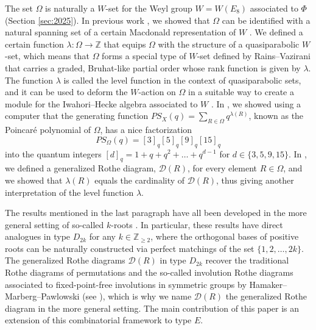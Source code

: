 \documentclass[11pt]{amsart}
\theoremstyle{plain}
\theoremstyle{definition}
\theoremstyle{remark}
\numberwithin{equation}{section}
\newcommand{\Z}{{\mathbb Z}}
\newcommand{\ra}{\rightarrow}
\newcommand{\res}{\mathscr{D}}
\newcommand{\ob}{\Omega}
\begin{document}
The set $\ob$ is naturally a $W$-set for the Weyl group $W=W(E_8)$ associated to
$\Phi$ (Section \ref{sec:2025}). In previous work \cite{gx5}, we showed that
$\ob$ can be identified with a natural spanning set of a certain Macdonald
representation of $W$ \cite[Section 1]{gx5}. We defined a certain function
$\lambda: \ob\ra \Z$ that equips $\ob$ with the structure of a quasiparabolic
$W$-set, which means that $\ob$ forms a special type of $W$-set defined by
Rains--Vazirani \cite{rains13} that carries a graded, Bruhat-like partial order
whose rank function is given by $\lambda$. The function $\lambda$ is called the
level function in the context of quasiparabolic sets, and it can be used to
deform the $W$-action on $\ob$ in a suitable way to create a module for the
Iwahori--Hecke algebra associated to $W$ \cite[Theorem 7.1]{rains13}. In
\cite[Section 7.1]{gx5}, we showed using a computer that the generating function
$PS_X(q)=\sum_{R\in \ob} q^{\lambda(R)}$, known as the Poincar\'e polynomial of
$\ob$, has a nice factorization \begin{equation} \label{eq:ps_X}
PS_\ob(q)=[3]_q[5]_q[9]_q[15]_q \end{equation} into the quantum integers
$[d]_q=1+q+q^2+\dots+q^{d-1}$ for $d\in \{3,5,9,15\}$. In \cite{gx6}, we defined
a generalized Rothe diagram, $\res(R)$, for every element $R\in \ob$, and we
showed that $\lambda(R)$ equals the cardinality of $\res(R)$, thus giving
another interpretation of the level function $\lambda$.   

The results mentioned in the last paragraph have all been developed in the more
general setting of so-called $k$-roots \cite[Section 2.2]{gx6}. In particular,
these results have direct analogues in type $D_{2k}$ for any $k\in \Z_{\ge 2}$,
where the orthogonal bases of positive roots can be naturally constructed via
perfect matchings of the set $\{1,2, \dots, 2k\}$. The generalized Rothe
diagrams $\res(R)$ in type $D_{2k}$ recover the traditional Rothe diagrams of
permutations and the so-called involution Rothe diagrams associated to
fixed-point-free involutions in symmetric groups by Hamaker--Marberg--Pawlowski
\cite{hamaker20} (see \cite[Theorem 3.11 and Theorem 3.14]{gx6}), which is why
we name $\res(R)$ the generalized Rothe diagram in the more general setting. The
main contribution of this paper is an extension of this combinatorial framework
to type $E$.
\end{document}
